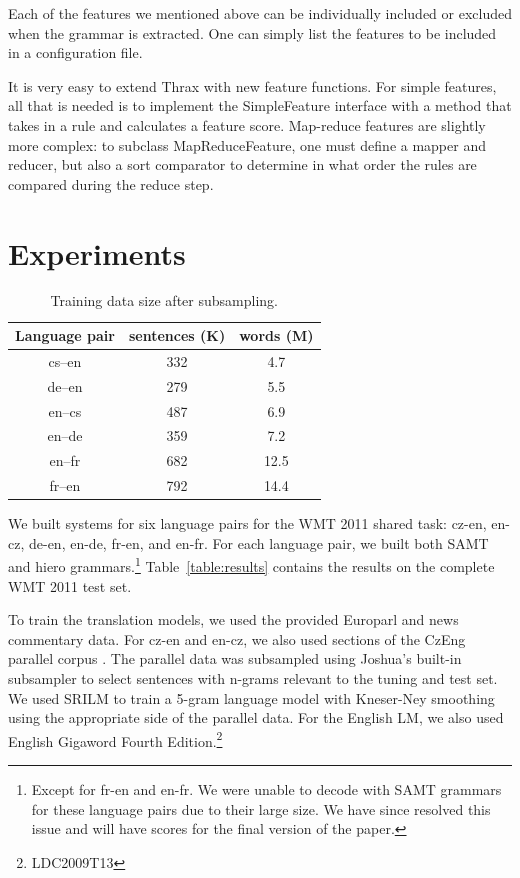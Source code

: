 \documentclass[11pt]{article}
\begin{document}
Each of the features we mentioned above can be individually included or excluded when the grammar is extracted. One can simply list the features to be included in a configuration file.

It is very easy to extend Thrax with new feature functions. For simple features, all that is needed is to implement the {\sc SimpleFeature} interface with a method that takes in a rule and calculates a feature score. Map-reduce features are slightly more complex: to subclass {\sc MapReduceFeature}, one must define a mapper and reducer, but also a sort comparator to determine in what order the rules are compared during the reduce step.


\section{Experiments}
\label{section:results}

\begin{table}
\centering
\begin{tabular}{|c|c|c|}
Language pair & sentences (K) & words (M) \\
\hline\hline
cs--en & 332 & 4.7 \\
de--en & 279 & 5.5 \\
en--cs & 487 & 6.9 \\
en--de & 359 & 7.2 \\
en--fr & 682 & 12.5 \\
fr--en & 792 & 14.4 \\
\end{tabular}
\caption{Training data size after subsampling.\label{training-data-size}}
\end{table}

We built systems for six language pairs for the WMT 2011 shared task:
cz-en, en-cz, de-en, en-de, fr-en, and en-fr.  For each language pair,
we built both SAMT and hiero grammars.\footnote{Except for fr-en and
  en-fr.  We were unable to decode with SAMT grammars for these
  language pairs due to their large size.  We have since resolved this
  issue and will have scores for the final version of the paper.}
Table~\ref{table:results} contains the results on the complete WMT
2011 test set.

To train the translation models, we used the provided Europarl and
news commentary data. For cz-en and en-cz, we also used sections of
the CzEng parallel corpus \cite{czeng:pbml:2009}.  The parallel data
was subsampled using Joshua's built-in subsampler to select sentences
with n-grams relevant to the tuning and test set.  We used SRILM to train a 5-gram language model with Kneser-Ney smoothing using the appropriate side of the parallel data. For the English LM, we also used English Gigaword Fourth Edition.\footnote{LDC2009T13}
\end{document}
